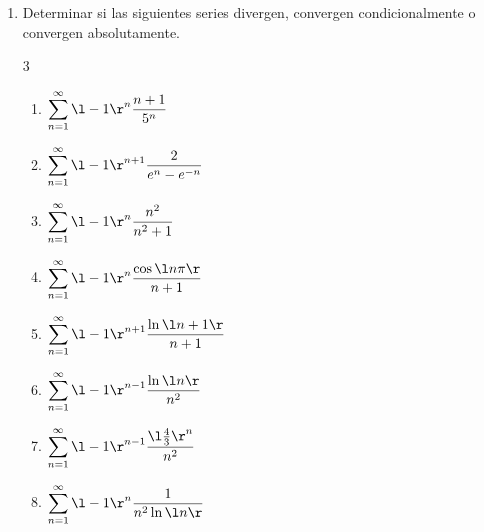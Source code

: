 \begin{enumerate}
\item Determinar si las siguientes series divergen, convergen condicionalmente o convergen absolutamente.
\begin{multicols}{3}
\begin{enumerate}
\item $ \displaystyle{ \sum_{n=1}^{\infty}{ \l -1 \r^n \frac{n+1}{5^n} } } $
\item $ \displaystyle{ \sum_{n=1}^{\infty}{ \l -1 \r^{n+1} \frac{2}{e^n - e^{-n}} } } $
\item $ \displaystyle{ \sum_{n=1}^{\infty}{ \l -1 \r^n \frac{n^2}{n^2 +1} } } $
\item $ \displaystyle{ \sum_{n=1}^{\infty}{ \l -1 \r^n \frac{\cos{\l n \pi \r}}{n+1} } } $
\item $ \displaystyle{ \sum_{n=1}^{\infty}{ \l -1 \r^{n+1} \frac{\ln{\l n+1 \r}}{n+1} } } $
\item $ \displaystyle{ \sum_{n=1}^{\infty}{ \l -1 \r^{n-1} \frac{\ln{\l n \r}}{n^2} } } $
\item $ \displaystyle{ \sum_{n=1}^{\infty}{ \l -1 \r^{n-1} \frac{\l \frac{4}{3} \r^n}{n^2} } } $
\item $ \displaystyle{ \sum_{n=1}^{\infty}{ \l -1 \r^n \frac{1}{n^2 \ln{\l n \r}} } } $
\end{enumerate}
\end{multicols}

\end{enumerate}
